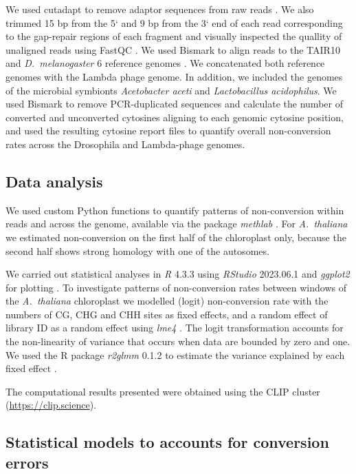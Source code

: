 \documentclass[10pt,letterpaper,draft]{article}
\begin{document}
We used cutadapt to remove adaptor sequences from raw reads \cite{martin2011cutadapt}.
We also trimmed 15 bp from the 5` and 9 bp from the 3` end of each read corresponding to the gap-repair regions of each fragment and visually inspected the quallity of unaligned reads using FastQC \cite{andrews2020fastqc}.
We used Bismark to align reads to the TAIR10 and \textit{D.~melanogaster} 6 reference genomes \cite{krueger2011bismark}.
We concatenated both reference genomes with the Lambda phage genome.
In addition, we included the genomes of the microbial symbionts \textit{Acetobacter aceti} and \textit{Lactobacillus acidophilus}.
We used Bismark to remove PCR-duplicated sequences and calculate the number of converted and unconverted cytosines aligning to each genomic cytosine position, and used the resulting cytosine report files to quantify overall non-conversion rates across the Drosophila and Lambda-phage genomes.

\subsection*{Data analysis}

We used custom Python functions to quantify patterns of non-conversion within reads and across the genome, available via the package \textit{methlab} \cite{ellis2023methlab}. For \emph{A.~thaliana} we estimated non-conversion on the first half of the chloroplast only, because the second half shows strong homology with one of the autosomes.

We carried out statistical analyses in \textit{R} 4.3.3 using \textit{RStudio} 2023.06.1 \cite{rlanguage, rstudio} and \textit{ggplot2} for plotting \cite{wickham2011ggplot2}. To investigate patterns of non-conversion rates between windows of the \textit{A.~thaliana} chloroplast we modelled (logit) non-conversion rate with the numbers of CG, CHG and CHH sites as fixed effects, and a random effect of library ID as a random effect using \textit{lme4} \cite{bates2015}. The logit transformation accounts for the non-linearity of variance that occurs when data are bounded by zero and one. We used the R package \textit{r2glmm} 0.1.2 to estimate the variance explained by each fixed effect \cite{r2glmm}.

The computational results presented were obtained using the CLIP cluster (\url{https://clip.science}).

\subsection*{Statistical models to accounts for conversion errors}
\end{document}
